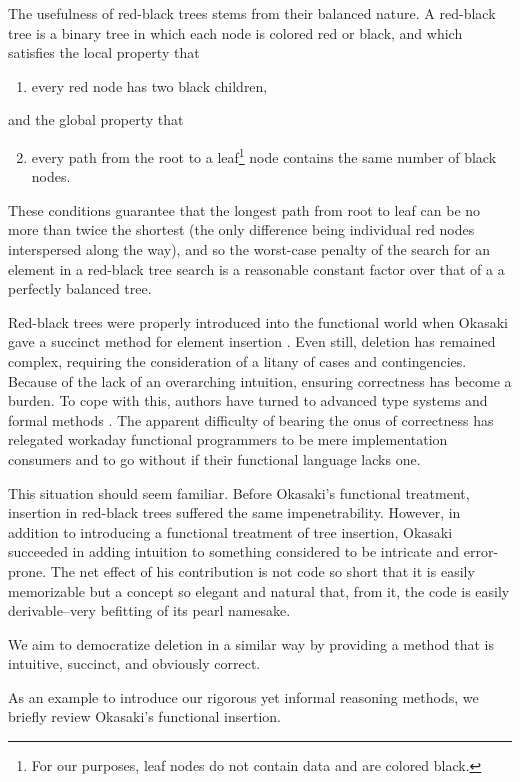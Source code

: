 \documentclass[preprint]{sigplanconf}
\begin{document}
The usefulness of red-black trees stems from their balanced nature. A red-black tree is a binary tree in which each node is colored red or black, and which satisfies the local property that
\begin{enumerate}
\item every red node has two black children,
\end{enumerate}
and the global property that
\begin{enumerate}
\setcounter{enumi}{1}
\item every path from the root to a leaf\footnote{For our purposes, leaf nodes do not contain data and are colored black.} node contains the same number of black nodes.
\end{enumerate}
These conditions guarantee that the longest path from root to leaf can be no more than twice the shortest (the only difference being individual red nodes interspersed along the way), and so the worst-case penalty of the search for an element in a red-black tree search is a reasonable constant factor over that of a a perfectly balanced tree.

Red-black trees were properly introduced into the functional world when Okasaki gave a succinct method for element insertion \cite{okasaki1999functional}. Even still, deletion has remained complex, requiring the consideration of a litany of cases and contingencies. Because of the lack of an overarching intuition, ensuring correctness has become a burden. To cope with this, authors have turned to advanced type systems \cite{kahrs2001red} and formal methods \cite{appel2011efficient}. The apparent difficulty of bearing the onus of correctness has relegated workaday functional programmers to be mere implementation consumers and to go without if their functional language lacks one.

This situation should seem familiar. Before Okasaki's functional treatment, insertion in red-black trees suffered the same impenetrability. However, in addition to introducing a functional treatment of tree insertion, Okasaki succeeded in adding intuition to something considered to be intricate and error-prone. The net effect of his contribution is not code so short that it is easily memorizable but a concept so elegant and natural that, from it, the code is easily derivable--very befitting of its pearl namesake.

We aim to democratize deletion in a similar way by providing a method that is intuitive, succinct, and obviously correct.

As an example to introduce our rigorous yet informal reasoning methods, we briefly review Okasaki's functional insertion.
\end{document}
